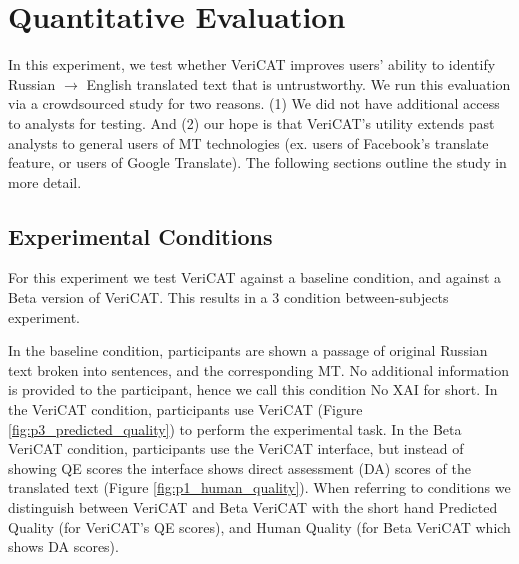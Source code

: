 \section{Quantitative Evaluation} 

In this experiment, we test whether VeriCAT improves users' ability to identify Russian $\rightarrow$ English translated text that is untrustworthy.    
We run this evaluation via a crowdsourced study for two reasons. (1) We did not have additional access to analysts for testing. And (2) our hope is that VeriCAT's utility extends past analysts to general users of MT technologies (ex. users of Facebook's translate feature, or users of Google Translate).     
The following sections outline the study in more detail. 

\subsection{Experimental Conditions}

For this experiment we test VeriCAT against a baseline condition, and against a Beta version of VeriCAT. This results in a 3 condition between-subjects experiment. 

In the baseline condition, participants are shown a passage of original Russian text broken into sentences, and the corresponding MT. No additional information is provided to the participant, hence we call this condition No XAI for short. In the VeriCAT condition, participants use VeriCAT (Figure \ref{fig:p3_predicted_quality}) to perform the experimental task. In the Beta VeriCAT condition, participants use the VeriCAT interface, but instead of showing QE scores the interface shows direct assessment (DA) scores of the translated text (Figure \ref{fig:p1_human_quality}). When referring to conditions we distinguish between VeriCAT and Beta VeriCAT with the short hand Predicted Quality (for VeriCAT's QE scores), and Human Quality (for Beta VeriCAT which shows DA scores). 

 
